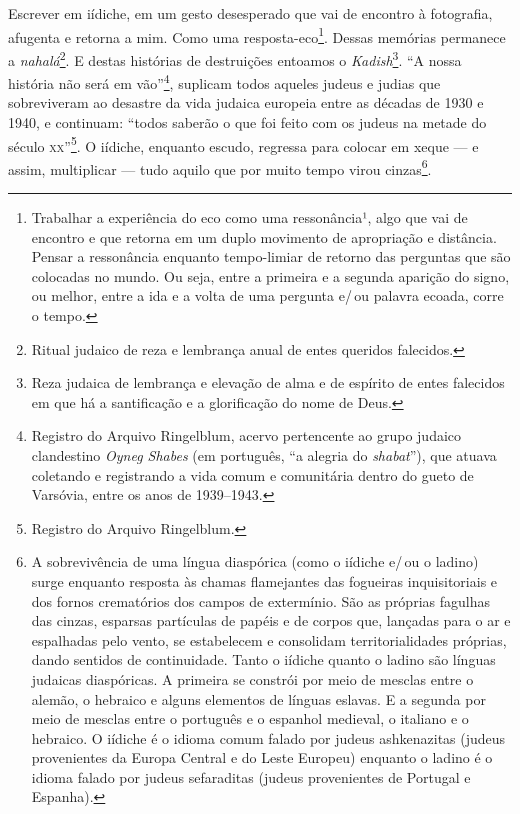 Escrever em iídiche, em um gesto desesperado que vai de encontro
à fotografia, afugenta e retorna a mim. Como uma
resposta-eco\footnote{Trabalhar a experiência do eco como uma
  ressonância¹, algo que vai de encontro e que retorna em um duplo
  movimento de apropriação e distância. Pensar a ressonância enquanto tempo-limiar de retorno das
  perguntas que são colocadas no mundo. Ou seja, entre a primeira e a
  segunda aparição do signo, ou melhor, entre a ida e a volta de uma
  pergunta e/\,ou palavra ecoada, corre o tempo.}. Dessas memórias
permanece a \emph{nahalá}\footnote{Ritual judaico de reza e lembrança
  anual de entes queridos falecidos.}. E destas histórias de destruições
entoamos o \emph{Kadish}\footnote{Reza judaica de lembrança e elevação
  de alma e de espírito de entes falecidos em que há a santificação e a
  glorificação do nome de Deus.}. ``A nossa história não será em
vão''\footnote{Registro do Arquivo Ringelblum, acervo pertencente ao
  grupo judaico clandestino \emph{Oyneg Shabes} (em português, ``a
  alegria do \emph{shabat}''), que atuava coletando e registrando a vida
  comum e comunitária dentro do gueto de Varsóvia, entre os anos de
  1939--1943.}, suplicam todos aqueles judeus e judias que sobreviveram
ao desastre da vida judaica europeia entre as décadas de 1930 e 1940, e
continuam: ``todos saberão o que foi feito com os judeus na metade do século \textsc{xx}''\footnote{Registro do Arquivo
  Ringelblum.}. O iídiche, enquanto escudo, regressa para colocar
em xeque --- e assim, multiplicar --- tudo aquilo que por muito tempo
virou cinzas\footnote{A sobrevivência de uma língua diaspórica (como o
  iídiche e/\,ou o ladino) surge enquanto resposta às
  chamas flamejantes das fogueiras inquisitoriais e dos fornos
  crematórios dos campos de extermínio. São as próprias fagulhas das
  cinzas, esparsas partículas de papéis e de corpos que, lançadas para o
  ar e espalhadas pelo vento, se estabelecem e consolidam
  territorialidades próprias, dando sentidos de continuidade. Tanto o iídiche quanto o ladino são línguas
  judaicas diaspóricas. A primeira se constrói por meio de mesclas entre
  o alemão, o hebraico e alguns elementos de línguas eslavas. E a
  segunda por meio de mesclas entre o português e o espanhol medieval, o
  italiano e o hebraico. O iídiche é o idioma comum falado por
  judeus ashkenazitas (judeus provenientes da Europa Central e do
  Leste Europeu) enquanto o ladino é o idioma falado por judeus
  sefaraditas (judeus provenientes de Portugal e Espanha).}.


